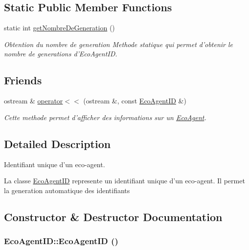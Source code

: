 \subsection*{Static Public Member Functions}
\begin{CompactItemize}
\item 
\hypertarget{classEcoAgentID_9b8f29915bff7e36bf53e695c148517e}{
static int \hyperlink{classEcoAgentID_9b8f29915bff7e36bf53e695c148517e}{getNombreDeGeneration} ()}
\label{classEcoAgentID_9b8f29915bff7e36bf53e695c148517e}

\begin{CompactList}\small\item\em Obtention du nombre de generation Methode statique qui permet d'obtenir le nombre de generations d'EcoAgentID. \item\end{CompactList}\end{CompactItemize}
\subsection*{Friends}
\begin{CompactItemize}
\item 
\hypertarget{classEcoAgentID_d5e8cda1cb99079142dfa371760795cb}{
ostream \& \hyperlink{classEcoAgentID_d5e8cda1cb99079142dfa371760795cb}{operator$<$$<$} (ostream \&, const \hyperlink{classEcoAgentID}{EcoAgentID} \&)}
\label{classEcoAgentID_d5e8cda1cb99079142dfa371760795cb}

\begin{CompactList}\small\item\em Cette methode permet d'afficher des informations sur un \hyperlink{classEcoAgent}{EcoAgent}. \item\end{CompactList}\end{CompactItemize}


\subsection{Detailed Description}
Identifiant unique d'un eco-agent. 

La classe \hyperlink{classEcoAgentID}{EcoAgentID} represente un identifiant unique d'un eco-agent. Il permet la generation automatique des identifiants 

\subsection{Constructor \& Destructor Documentation}
\hypertarget{classEcoAgentID_9c337e2ad56912db99193c03d1f82c56}{
\subsubsection[{EcoAgentID}]{\setlength{\rightskip}{0pt plus 5cm}EcoAgentID::EcoAgentID ()}}
\label{classEcoAgentID_9c337e2ad56912db99193c03d1f82c56}


